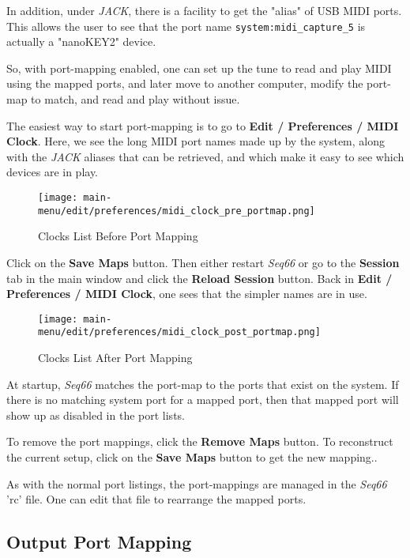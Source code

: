    In addition, under \textsl{JACK}, there is a facility to get the "alias" of
   USB MIDI ports.  This allows the user to see that the port name
   \texttt{system:midi\_capture\_5} is actually a "nanoKEY2" device.

   So, with port-mapping enabled, one can set up the tune to read and play MIDI
   using the mapped ports, and later move to another computer, modify the
   port-map to match, and read and play without issue.

   The easiest way to start port-mapping is to go to
   \textbf{Edit / Preferences / MIDI Clock}.
   Here, we see the long MIDI port names made up by the system, along
   with the \textsl{JACK} aliases that can be retrieved, and which make it easy
   to see which devices are in play.

\begin{figure}[H]
   \centering 
   \texttt{[image: main-menu/edit/preferences/midi\_clock\_pre\_portmap.png]}
   \caption{Clocks List Before Port Mapping}
   \label{fig:clocks_list_before_port_mapping}
\end{figure}

   Click on the \textbf{Save Maps} button.
   Then either restart \textsl{Seq66} or go to the \textbf{Session} tab
   in the main window and click the \textbf{Reload Session} button.
   Back in \textbf{Edit / Preferences / MIDI Clock},
   one sees that the simpler names are in use.

\begin{figure}[H]
   \centering 
   \texttt{[image: main-menu/edit/preferences/midi\_clock\_post\_portmap.png]}
   \caption{Clocks List After Port Mapping}
   \label{fig:clocks_list_after_port_mapping}
\end{figure}

   At startup, \textsl{Seq66} matches the port-map to the ports that exist on
   the system.  If there is no matching system port for a mapped port, then
   that mapped port will show up as disabled in the port lists.

   To remove the port mappings, click the \textbf{Remove Maps} button.
   To reconstruct the current setup, click on the \textbf{Save Maps} button to
   get the new mapping..

   As with the normal port listings, the port-mappings are managed in the
   \textsl{Seq66} 'rc' file.
   One can edit that file to rearrange the mapped ports.

\subsection{Output Port Mapping}
\label{subsec:output_port_mapping}

